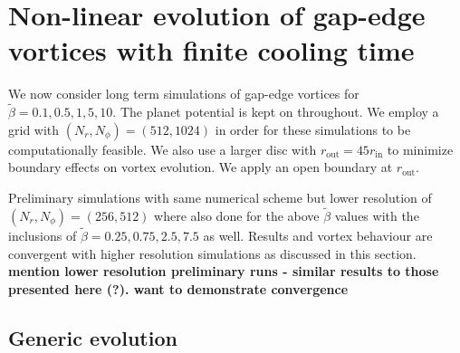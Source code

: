 
\section{Non-linear evolution of
  gap-edge vortices with finite cooling time}\label{nonlinear} 

We now consider long term simulations of gap-edge vortices for
$\tilde{\beta}=0.1,0.5,1,5,10$. The planet potential is kept on
throughout.  
We employ a grid with $(N_r,N_{\phi})=(512,1024)$ 
in order for these simulations to be computationally feasible. We also use a larger
disc with $r_{\mathrm{out}}=45r_{\mathrm{in}}$ to minimize boundary
effects on vortex evolution. We apply an open boundary at
$r_\mathrm{out}$.

Preliminary simulations with same numerical scheme but lower resolution of
 $(N_r,N_{\phi})=(256,512)$ where also done for the above $\tilde\beta$ values
with the inclusions of $\tilde{\beta}=0.25,0.75,2.5,7.5$ as well.
Results and vortex behaviour are convergent with
higher resolution simulations as discussed in this section.
 {\bf mention lower resolution preliminary runs -
  similar results to those presented here (?). want to demonstrate convergence}





\subsection{Generic evolution}

